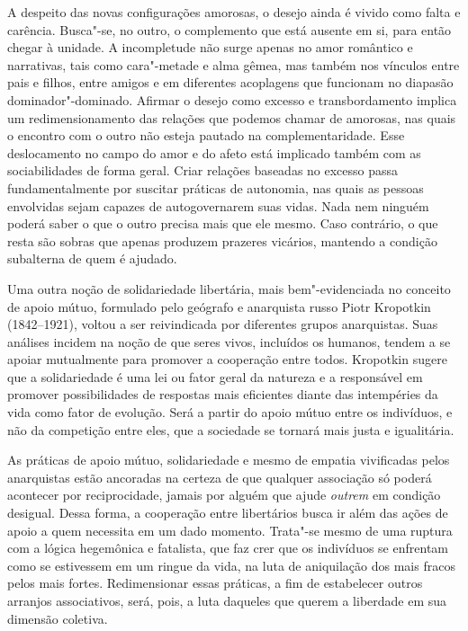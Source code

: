 A despeito das novas configurações amorosas, o desejo ainda é vivido
como falta e carência. Busca"-se, no outro, o complemento que está
ausente em si, para então chegar à unidade. A incompletude não surge
apenas no amor romântico e narrativas, tais como cara"-metade e alma
gêmea, mas também nos vínculos entre pais e filhos, entre amigos e em
diferentes acoplagens que funcionam no diapasão dominador"-dominado.
Afirmar o desejo como excesso e transbordamento implica um
redimensionamento das relações que podemos chamar de amorosas, nas quais
o encontro com o outro não esteja pautado na complementaridade. Esse
deslocamento no campo do amor e do afeto está implicado também com as
sociabilidades de forma geral. Criar relações baseadas no excesso passa
fundamentalmente por suscitar práticas de autonomia, nas quais as
pessoas envolvidas sejam capazes de autogovernarem suas vidas. Nada nem
ninguém poderá saber o que o outro precisa mais que ele mesmo. Caso
contrário, o que resta são sobras que apenas produzem prazeres vicários,
mantendo a condição subalterna de quem é ajudado.

Uma outra noção de solidariedade libertária, mais bem"-evidenciada no
conceito de apoio mútuo, formulado pelo geógrafo e anarquista russo
Piotr Kropotkin (1842--1921), voltou a ser reivindicada por diferentes
grupos anarquistas. Suas análises incidem na noção de que seres vivos,
incluídos os humanos, tendem a se apoiar mutualmente para promover a
cooperação entre todos. Kropotkin sugere que a solidariedade é
uma lei ou fator geral da natureza e a responsável em promover
possibilidades de respostas mais eficientes diante das intempéries da
vida como fator de evolução. Será a partir do apoio mútuo entre os
indivíduos, e não da competição entre eles, que a sociedade se tornará
mais justa e igualitária.

As práticas de apoio mútuo, solidariedade e mesmo de empatia vivificadas
pelos anarquistas estão ancoradas na certeza de que qualquer associação
só poderá acontecer por reciprocidade, jamais por alguém que ajude
\emph{outrem} em condição desigual. Dessa forma, a cooperação entre
libertários busca ir além das ações de apoio a quem necessita em um dado
momento. Trata"-se mesmo de uma ruptura com a lógica hegemônica e
fatalista, que faz crer que os indivíduos se enfrentam como se
estivessem em um ringue da vida, na luta de aniquilação dos mais fracos
pelos mais fortes. Redimensionar essas práticas, a fim de estabelecer
outros arranjos associativos, será, pois, a luta daqueles que querem a
liberdade em sua dimensão coletiva.

